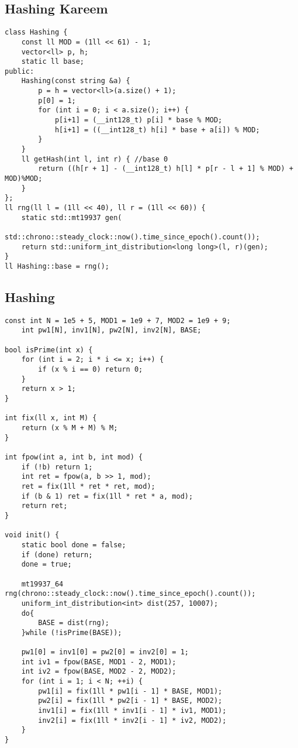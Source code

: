 \documentclass{article}
\begin{document}
{\subsection{Hashing Kareem}
\begin{verbatim}
class Hashing {
    const ll MOD = (1ll << 61) - 1;
    vector<ll> p, h;
    static ll base;
public:
    Hashing(const string &a) {
        p = h = vector<ll>(a.size() + 1);
        p[0] = 1;
        for (int i = 0; i < a.size(); i++) {
            p[i+1] = (__int128_t) p[i] * base % MOD;
            h[i+1] = ((__int128_t) h[i] * base + a[i]) % MOD;
        }
    }
    ll getHash(int l, int r) { //base 0
        return ((h[r + 1] - (__int128_t) h[l] * p[r - l + 1] % MOD) + MOD)%MOD;
    }
};
ll rng(ll l = (1ll << 40), ll r = (1ll << 60)) {
    static std::mt19937 gen(
            std::chrono::steady_clock::now().time_since_epoch().count());
    return std::uniform_int_distribution<long long>(l, r)(gen);
}
ll Hashing::base = rng();
\end{verbatim}

\subsection{Hashing}
\begin{verbatim}
const int N = 1e5 + 5, MOD1 = 1e9 + 7, MOD2 = 1e9 + 9;
	int pw1[N], inv1[N], pw2[N], inv2[N], BASE;

bool isPrime(int x) {
    for (int i = 2; i * i <= x; i++) {
        if (x % i == 0) return 0;
    }
    return x > 1;
}

int fix(ll x, int M) {
    return (x % M + M) % M;
}

int fpow(int a, int b, int mod) {
    if (!b) return 1;
    int ret = fpow(a, b >> 1, mod);
    ret = fix(1ll * ret * ret, mod);
    if (b & 1) ret = fix(1ll * ret * a, mod);
    return ret;
}

void init() {
    static bool done = false;
    if (done) return;
    done = true;
    
    mt19937_64 rng(chrono::steady_clock::now().time_since_epoch().count());
    uniform_int_distribution<int> dist(257, 10007);
    do{
        BASE = dist(rng);
    }while (!isPrime(BASE));

    pw1[0] = inv1[0] = pw2[0] = inv2[0] = 1;
    int iv1 = fpow(BASE, MOD1 - 2, MOD1);
    int iv2 = fpow(BASE, MOD2 - 2, MOD2);
    for (int i = 1; i < N; ++i) {
        pw1[i] = fix(1ll * pw1[i - 1] * BASE, MOD1);
        pw2[i] = fix(1ll * pw2[i - 1] * BASE, MOD2);
        inv1[i] = fix(1ll * inv1[i - 1] * iv1, MOD1);
        inv2[i] = fix(1ll * inv2[i - 1] * iv2, MOD2);
    }
}


\end{verbatim}}
\end{document}
